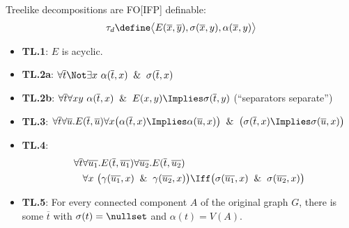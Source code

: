 \documentclass{beamer}
\renewcommand \o \overline
\begin{document}
\begin{frame}
  Treelike decompositions are FO[IFP] definable:
  \begin{equation*}
    \tau_{d} \define \bigl\langle E(\overline{x}, \overline{y}),
    \sigma(\overline{x}, y), \alpha(\overline{x}, y) \bigr\rangle
  \end{equation*}
  \begin{itemize}
  \item \textbf{TL.1}: $E$ is acyclic.
  \item \textbf{TL.2a}: $\forall \overline{t} \Not \exists x\ 
    \alpha(\overline{t}, x) \And \sigma(\overline{t}, x)$
  \item \textbf{TL.2b}: $\forall \overline{t} \forall x y\ 
    \alpha(\overline{t}, x) \And E(x, y) \Implies \sigma(\overline{t}, y)$
    (``separators separate'')
   \item \textbf{TL.3}: $\forall \overline{t} \forall \overline{u}
     . E(\overline{t}, \overline{u}) \forall x \bigl(\alpha(\o{t}, x)
     \Implies \alpha(\o{u}, x)\bigr) \And \bigl(\sigma(\o{t}, x) \Implies
     \sigma(\o{u}, x)\bigr)$
   \item \textbf{TL.4}: 
     \vspace{-5mm}
     \begin{align*}
       \forall \overline{t} &\forall \o{u_1} . E(\o{t},
       \o{u_1}) \forall \o{u_2} . E(\o{t}, \o{u_2}) \\
       &{} \forall x \ \bigl(\gamma(\o{u_1}, x) \And \gamma(\o{u_2},
       x)\bigr) \Iff \bigl( \sigma(\o{u_1}, x) \And \sigma(\o{u_2}, x) \bigr) \\
     \end{align*}
     \vspace{-10mm}
   \item \textbf{TL.5}: For every connected component $A$ of the original
     graph $G$, there is some $\overline{t}$ with $\sigma(t) = \nullset$
     and $\alpha(t) = V(A)$.
  \end{itemize}
\end{frame}
\end{document}
